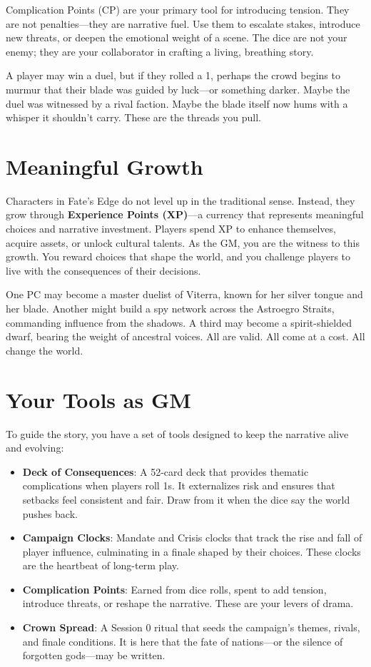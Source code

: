 Complication Points (CP) are your primary tool for introducing tension. They are not penalties—they are narrative fuel. Use them to escalate stakes, introduce new threats, or deepen the emotional weight of a scene. The dice are not your enemy; they are your collaborator in crafting a living, breathing story.

A player may win a duel, but if they rolled a 1, perhaps the crowd begins to murmur that their blade was guided by luck—or something darker. Maybe the duel was witnessed by a rival faction. Maybe the blade itself now hums with a whisper it shouldn’t carry. These are the threads you pull.

\section*{Meaningful Growth}

Characters in Fate’s Edge do not level up in the traditional sense. Instead, they grow through \textbf{Experience Points (XP)}—a currency that represents meaningful choices and narrative investment. Players spend XP to enhance themselves, acquire assets, or unlock cultural talents. As the GM, you are the witness to this growth. You reward choices that shape the world, and you challenge players to live with the consequences of their decisions.

One PC may become a master duelist of Viterra, known for her silver tongue and her blade. Another might build a spy network across the Astroegro Straits, commanding influence from the shadows. A third may become a spirit-shielded dwarf, bearing the weight of ancestral voices. All are valid. All come at a cost. All change the world.

\section*{Your Tools as GM}

To guide the story, you have a set of tools designed to keep the narrative alive and evolving:

\begin{itemize}
    \item \textbf{Deck of Consequences}: A 52-card deck that provides thematic complications when players roll 1s. It externalizes risk and ensures that setbacks feel consistent and fair. Draw from it when the dice say the world pushes back.
    \item \textbf{Campaign Clocks}: Mandate and Crisis clocks that track the rise and fall of player influence, culminating in a finale shaped by their choices. These clocks are the heartbeat of long-term play.
    \item \textbf{Complication Points}: Earned from dice rolls, spent to add tension, introduce threats, or reshape the narrative. These are your levers of drama.
    \item \textbf{Crown Spread}: A Session 0 ritual that seeds the campaign’s themes, rivals, and finale conditions. It is here that the fate of nations—or the silence of forgotten gods—may be written.
\end{itemize}

